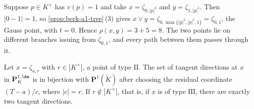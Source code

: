 \begin{example}
\label{ex:ch08-path-distance}
Suppose $p\in K^\times$ has $v(p)=1$ and take
$x=\zeta_{0,|p|^3}$ and $y=\zeta_{1,|p|^5}$.  Then $|0-1|=1$, so
\cref{prop:berk-a1-tree}\,(3) gives
$x\vee y=\zeta_{0,\max\{|p|^3,|p|^5,1\}}=\zeta_{0,1}$, the Gauss point, with
$t=0$.  Hence $\rho(x,y)=3+5=8$.  The two points lie on different branches
issuing from $\zeta_{0,1}$, and every path between them passes through it.
\end{example}

\begin{proposition}
\label{prop:ch08-branching}
Let $x=\zeta_{a,r}$ with $r\in|K^\times|$, a point of type $\mathrm{II}$.
The set of tangent directions at $x$ in $\mathbf P^{1,\An}_K$ is in
bijection with $\mathbf P^1(\widetilde K)$ after choosing the residual
coordinate $(T-a)/c$, where $|c|=r$.  If $r\notin|K^\times|$,
that is, if $x$ is of type $\mathrm{III}$, there are exactly two tangent
directions.
\end{proposition}

